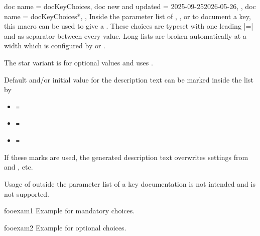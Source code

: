 \enlargethispage*{10mm}
\begin{docCommands}[doc parameter=\marg{comma separated list of choices}]
  {
    {
      doc name = docKeyChoices,
      doc new and updated = {2025-09-25}{2026-05-26},
    },
    {
      doc name = docKeyChoices*,
    },
  }
  Inside the parameter list of , , or 
  to document a key, this macro can be used to give
  a .
  These choices are typeset with one leading |=| and 
  as separator between every value. Long lists are broken automatically at a width
  which is configured by  or .\par
  The star variant is for optional values and uses .\par
  Default and/or initial value for the description text can be marked inside the list by
  \begin{itemize}
  \item{}\texttt{=}
  \item{}\texttt{=}
  \item{}\texttt{=}
  \end{itemize}
  If these marks are used, the generated description text overwrites settings
  from  and , etc.
  \begin{marker}
  Usage of  outside the parameter list of a key
  documentation is not intended and is not supported.
  \end{marker}
\begin{dispExample}
\begin{docKey}[foo]{fooexam1}{}{}
  Example for mandatory choices.
\end{docKey}
\end{dispExample}
\begin{dispExample}
\begin{docKey}[foo]{fooexam2}{}{}
  Example for optional choices.
\end{docKey}
\end{dispExample}
\begin{dispExample}

\end{dispExample}
\end{docCommands}
